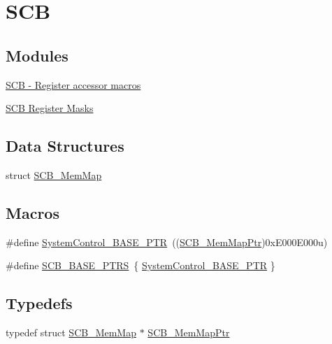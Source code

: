 \hypertarget{group___s_c_b___peripheral}{}\section{S\+CB}
\label{group___s_c_b___peripheral}
\subsection*{Modules}
\begin{DoxyCompactItemize}
\item 
\hyperlink{group___s_c_b___register___accessor___macros}{S\+C\+B -\/ Register accessor macros}
\item 
\hyperlink{group___s_c_b___register___masks}{S\+C\+B Register Masks}
\end{DoxyCompactItemize}
\subsection*{Data Structures}
\begin{DoxyCompactItemize}
\item 
struct \hyperlink{struct_s_c_b___mem_map}{S\+C\+B\+\_\+\+Mem\+Map}
\end{DoxyCompactItemize}
\subsection*{Macros}
\begin{DoxyCompactItemize}
\item 
\#define \hyperlink{group___s_c_b___peripheral_gaf22864785770f832103e904244e078cb}{System\+Control\+\_\+\+B\+A\+S\+E\+\_\+\+P\+TR}~((\hyperlink{group___s_c_b___peripheral_ga08aca299c99cac47121d9e64e7b8e1cf}{S\+C\+B\+\_\+\+Mem\+Map\+Ptr})0x\+E000\+E000u)
\item 
\#define \hyperlink{group___s_c_b___peripheral_gaf74b4dbfa6fd0a5607314e170a0c1d48}{S\+C\+B\+\_\+\+B\+A\+S\+E\+\_\+\+P\+T\+RS}~\{ \hyperlink{group___s_c_b___peripheral_gaf22864785770f832103e904244e078cb}{System\+Control\+\_\+\+B\+A\+S\+E\+\_\+\+P\+TR} \}
\end{DoxyCompactItemize}
\subsection*{Typedefs}
\begin{DoxyCompactItemize}
\item 
typedef struct \hyperlink{struct_s_c_b___mem_map}{S\+C\+B\+\_\+\+Mem\+Map} $\ast$ \hyperlink{group___s_c_b___peripheral_ga08aca299c99cac47121d9e64e7b8e1cf}{S\+C\+B\+\_\+\+Mem\+Map\+Ptr}
\end{DoxyCompactItemize}


